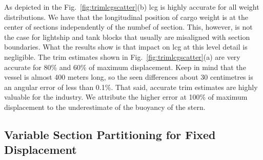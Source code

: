 \documentclass[runningheads]{llncs}
\begin{document}
As depicted in the Fig.~\ref{fig:trimlcgscatter}(b) lcg is highly accurate for all weight distributions. We have that the longitudinal position of cargo weight is at the center of sections independently of the numbef of section. This, however, is not the case for lightship and tank blocks that usually are misaligned with section boundaries. What the results show is that impact on lcg at this level detail is negligible. The trim estimates shown in Fig.~\ref{fig:trimlcgscatter}(a) are very accurate for 80\% and 60\% of maximum displacement. Keep in mind that the vessel is almost 400 meters long, so the seen differences about 30 centimetres is an angular error of less than 0.1\%. That said, accurate trim estimates are highly valuable for the industry. We attribute the higher error at 100\% of maximum displacement to the underestimate of the buoyancy of the stern.
 
 
 
\subsection{Variable Section Partitioning for Fixed Displacement}
\end{document}

